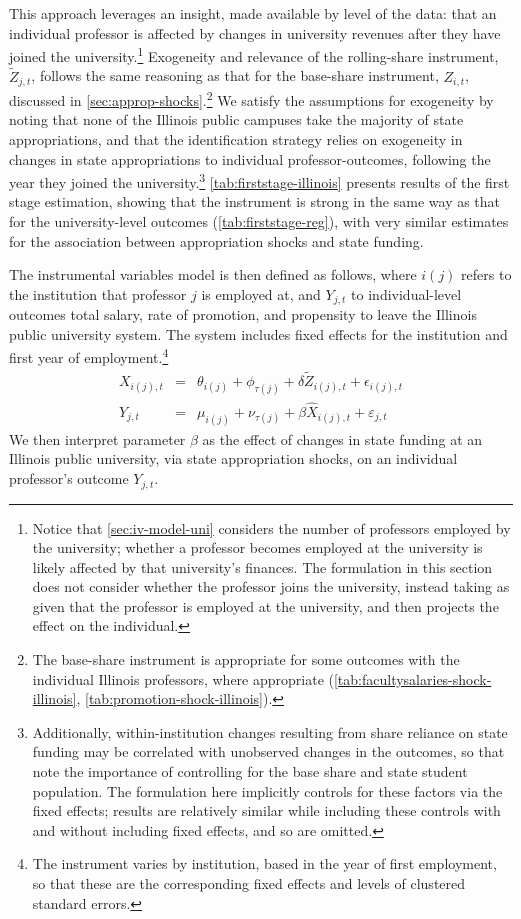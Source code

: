 This approach leverages an insight, made available by level of the data: that an individual professor is affected by changes in university revenues after they have joined the university.\footnote{
    Notice that \autoref{sec:iv-model-uni} considers the number of professors employed by the university; whether a professor becomes employed at the university is likely affected by that university's finances.
    The formulation in this section does not consider whether the professor joins the university, instead taking as given that the professor is employed at the university, and then projects the effect on the individual.
}
Exogeneity and relevance of the rolling-share instrument, $\tilde Z_{j,t}$, follows the same reasoning as that for the base-share instrument, $Z_{i,t}$, discussed in \autoref{sec:approp-shocks}.\footnote{
    The base-share instrument is appropriate for some outcomes with the individual Illinois professors, where appropriate (\autoref{tab:facultysalaries-shock-illinois}, \ref{tab:promotion-shock-illinois}).
}
We satisfy the assumptions for exogeneity by noting that none of the Illinois public campuses take the majority of state appropriations, and that the identification strategy relies on exogeneity in changes in state appropriations to individual professor-outcomes, following the year they joined the university.\footnote{
    Additionally, within-institution changes resulting from share reliance on state funding may be correlated with unobserved changes in the outcomes, so that \cite{NBERw27885} note the importance of controlling for the base share and state student population.
    The formulation here implicitly controls for these factors via the fixed effects; results are relatively similar while including these controls with and without including fixed effects, and so are omitted.
}
\autoref{tab:firststage-illinois} presents results of the first stage estimation, showing that the instrument is strong in the same way as that for the university-level outcomes (\autoref{tab:firststage-reg}), with very similar estimates for the association between appropriation shocks and state funding.

The instrumental variables model is then defined as follows, where $i(j)$ refers to the institution that professor $j$ is employed at, and $Y_{j,t}$ to individual-level outcomes total salary, rate of promotion, and propensity to leave the Illinois public university system.
The system includes fixed effects for the institution and first year of employment.\footnote{
    The instrument varies by institution, based in the year of first employment, so that these are the corresponding fixed effects and levels of clustered standard errors.
}
\begin{eqnarray}
    \label{eqn:secondstage1_indiv}
    X_{i(j),t} &=& \theta_{i(j)} + \phi_{\tau(j)} + \delta \tilde Z_{i(j),t} + \epsilon_{i(j),t} \\
    \label{eqn:secondstage2_indiv}
    Y_{j,t} &=& \mu_{i(j)} + \nu_{\tau(j)} + \beta \widehat X_{i(j),t} + \varepsilon_{j,t}
\end{eqnarray}
We then interpret parameter $\beta$ as the effect of changes in state funding at an Illinois public university, via state appropriation shocks, on an individual professor's outcome $Y_{j,t}$.
